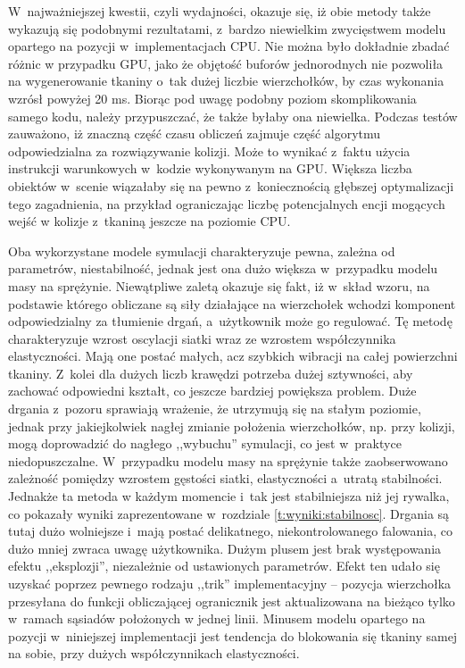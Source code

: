 	W~najważniejszej kwestii, czyli wydajności, okazuje się, iż obie metody także wykazują się podobnymi rezultatami, z~bardzo niewielkim zwycięstwem modelu opartego na pozycji w~implementacjach CPU. Nie można było dokładnie zbadać różnic w przypadku GPU, jako że objętość buforów jednorodnych nie pozwoliła na wygenerowanie tkaniny o~tak dużej liczbie wierzchołków, by czas wykonania wzrósł powyżej 20 ms. Biorąc pod uwagę podobny poziom skomplikowania samego kodu, należy przypuszczać, że także byłaby ona niewielka. Podczas testów zauważono, iż znaczną część czasu obliczeń zajmuje część algorytmu odpowiedzialna za rozwiązywanie kolizji. Może to wynikać z~faktu użycia instrukcji warunkowych w~kodzie wykonywanym na GPU. Większa liczba obiektów w~scenie wiązałaby się na pewno z~koniecznością głębszej optymalizacji tego zagadnienia, na przykład ograniczając liczbę potencjalnych encji mogących wejść w kolizje z~tkaniną jeszcze na poziomie CPU.
	
	Oba wykorzystane modele symulacji charakteryzuje pewna, zależna od parametrów, niestabilność, jednak jest ona dużo większa w~przypadku modelu masy na sprężynie. Niewątpliwe zaletą okazuje się fakt, iż w~skład wzoru, na podstawie którego obliczane są siły działające na wierzchołek wchodzi komponent odpowiedzialny za tłumienie drgań, a~użytkownik może go regulować. Tę metodę charakteryzuje wzrost oscylacji siatki wraz ze wzrostem współczynnika elastyczności. Mają one postać małych, acz szybkich wibracji na całej powierzchni tkaniny. Z~kolei dla dużych liczb krawędzi potrzeba dużej sztywności, aby zachować odpowiedni kształt, co jeszcze bardziej powiększa problem. Duże drgania z~pozoru sprawiają wrażenie, że utrzymują się na stałym poziomie, jednak przy jakiejkolwiek nagłej zmianie położenia wierzchołków, np. przy kolizji, mogą doprowadzić do nagłego ,,wybuchu'' symulacji, co jest w~praktyce niedopuszczalne. W~przypadku modelu masy na sprężynie także zaobserwowano zależność pomiędzy wzrostem gęstości siatki, elastyczności a~utratą stabilności. Jednakże ta metoda w każdym momencie i~tak jest stabilniejsza niż jej rywalka, co pokazały wyniki zaprezentowane w~rozdziale \ref{t:wyniki:stabilnosc}. Drgania są tutaj dużo wolniejsze i~mają postać delikatnego, niekontrolowanego falowania, co dużo mniej zwraca uwagę użytkownika. Dużym plusem jest brak występowania efektu ,,eksplozji'', niezależnie od ustawionych parametrów. Efekt ten udało się uzyskać poprzez pewnego rodzaju ,,trik'' implementacyjny -- pozycja wierzchołka przesyłana do funkcji obliczającej ogranicznik jest aktualizowana na bieżąco tylko w~ramach sąsiadów położonych w jednej linii. Minusem modelu opartego na pozycji w~niniejszej implementacji jest tendencja do blokowania się tkaniny samej na sobie, przy dużych współczynnikach elastyczności.
	
